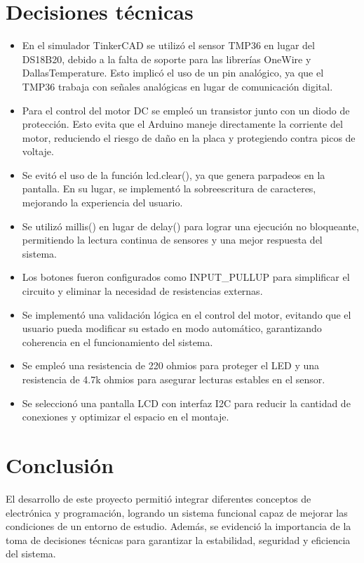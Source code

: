 \documentclass[conference]{IEEEtran}
\begin{document}
\section{Decisiones técnicas}
\begin{itemize}
\item En el simulador TinkerCAD se utilizó el sensor TMP36 en lugar del DS18B20, debido a la 
falta de soporte para las librerías OneWire y DallasTemperature. Esto implicó el uso de un pin 
analógico, ya que el TMP36 trabaja con señales analógicas en lugar de comunicación digital.
\item Para el control del motor DC se empleó un transistor junto con un diodo de protección. 
Esto evita que el Arduino maneje directamente la corriente del motor, reduciendo el riesgo de daño 
en la placa y protegiendo contra picos de voltaje.
\item Se evitó el uso de la función lcd.clear(), ya que genera parpadeos en la pantalla. 
En su lugar, se implementó la sobreescritura de caracteres, mejorando la experiencia del usuario.
\item Se utilizó millis() en lugar de delay() para lograr una ejecución no bloqueante, permitiendo 
la lectura continua de sensores y una mejor respuesta del sistema.
\item Los botones fueron configurados como INPUT\_PULLUP para simplificar el circuito y eliminar 
la necesidad de resistencias externas.
\item Se implementó una validación lógica en el control del motor, evitando que el usuario pueda 
modificar su estado en modo automático, garantizando coherencia en el funcionamiento del sistema.
\item Se empleó una resistencia de 220 ohmios para proteger el LED y una resistencia de 4.7k ohmios 
para asegurar lecturas estables en el sensor.
\item Se seleccionó una pantalla LCD con interfaz I2C para reducir la cantidad de conexiones y 
optimizar el espacio en el montaje.
\end{itemize}

\section{Conclusión}
El desarrollo de este proyecto permitió integrar diferentes conceptos de electrónica y programación, 
logrando un sistema funcional capaz de mejorar las condiciones de un entorno de estudio. 
Además, se evidenció la importancia de la toma de decisiones técnicas para garantizar la estabilidad, 
seguridad y eficiencia del sistema.
\end{document}
